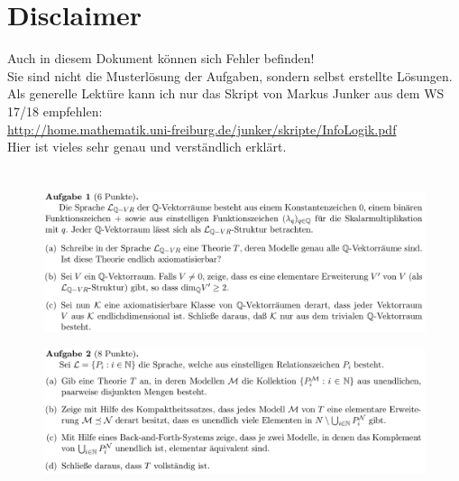 \documentclass[a4paper]{scrartcl}%
\begin{document}
\section*{Disclaimer}%
\label{sec:disclaimer}
Auch in diesem Dokument können sich Fehler befinden!\\
Sie sind nicht die Musterlösung der Aufgaben, sondern selbst erstellte Lösungen.\\

Als generelle Lektüre kann ich nur das Skript von Markus Junker aus dem WS 17/18 empfehlen:\\
\url{http://home.mathematik.uni-freiburg.de/junker/skripte/InfoLogik.pdf}\\
Hier ist vieles sehr genau und verständlich erklärt.%

\section*{}%
\label{sec:aufgabe_1}

    \begin{figure}[H]
        \includegraphics[scale=0.3]{./A-1.png}
        \label{fig:}
    \end{figure}


\label{sec:aufgabe_2}%

    \begin{figure}[H]
        \includegraphics[scale=0.3]{./A-2.png}
        \label{fig:}
    \end{figure}
\end{document}
